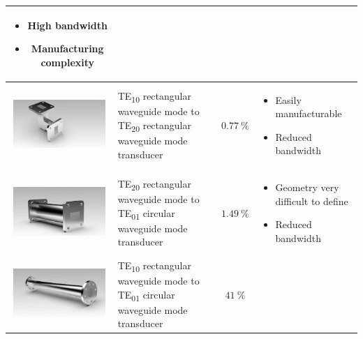 \documentclass[english,twoside]{article}
\newcommand\pro{\item[$+$]}
\newcommand\con{\item[$-$]}
\begin{document}
\begin{landscape}
\begin{table}[H]
{\begin{tabular}{c|l|c|l}
\begin{minipage}{5cm}
\begin{itemize}
								\pro High bandwidth
								\con Manufacturing complexity
							\end{itemize}
						\end{minipage}\\
						\hline
						\includegraphics[width=3.5cm,valign=c,margin=3pt]{renders/wrToWrTE20_irises} & \begin{minipage}{7cm}TE\textsubscript{10} rectangular waveguide mode to TE\textsubscript{20} rectangular waveguide mode transducer\end{minipage}  & $\SI{0.77}{\percent}$ & 
						\begin{minipage}{5cm} 
							\begin{itemize}
								\pro Easily manufacturable
								\con Reduced bandwidth
							\end{itemize}
						\end{minipage}\\
						\hline
						\includegraphics[width=3.5cm,valign=c,margin=3pt]{renders/wrTE20ToWcTE01-2} & \begin{minipage}{7cm}TE\textsubscript{20} rectangular waveguide mode to TE\textsubscript{01} circular waveguide mode transducer\end{minipage}  & $\SI{1.49}{\percent}$ & 
						\begin{minipage}{5cm} 
							\begin{itemize}
								\con Geometry very difficult to define
								\con Reduced bandwidth
							\end{itemize}
						\end{minipage}\\
						\hline
						\includegraphics[width=3.5cm,valign=c,margin=3pt]{renders/Conversor_Marie_Prodintec_optimizado_stp} & \begin{minipage}{7cm}TE\textsubscript{10} rectangular waveguide mode to TE\textsubscript{01} circular waveguide mode transducer\end{minipage}  & $\SI{41}{\percent}$ &

\end{tabular}}
\end{table}
\end{landscape}
\end{document}
